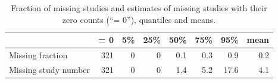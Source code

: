 \begin{table}[ht]
\centering
\begingroup\footnotesize
\begin{tabular}{lrrrrrrr}
  \hline
 & = 0 & 5\% & 25\% & 50\% & 75\% & 95\% & mean \\ 
  \hline
Missing fraction & 321 & 0 & 0 & 0.1 & 0.3 & 0.9 & 0.2 \\ 
  Missing study number & 321 & 0 & 0 & 1.4 & 5.2 & 17.6 & 4.1 \\ 
   \hline
\end{tabular}
\endgroup
\caption{Fraction of missing studies and estimates of missing studies with their zero counts (``= 0''), quantiles and means.} 
\label{copas.missing}
\end{table}






